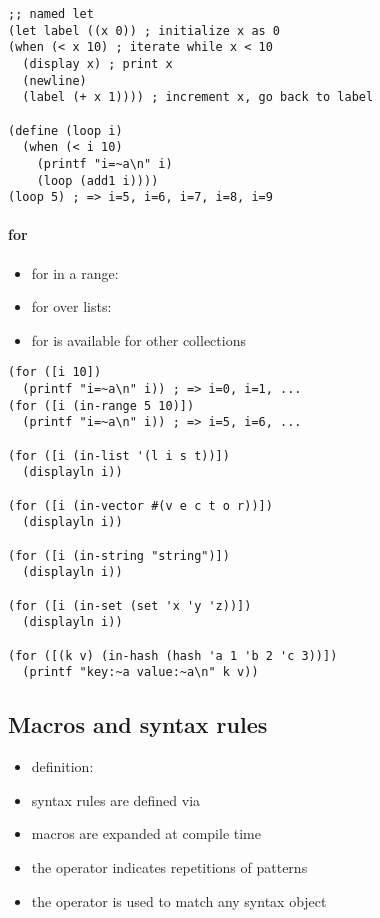\documentclass[a4paper,landscape,10pt]{article}
\begin{document}
\begin{multicols*}{2}
  \begin{lstlisting}[language=Racket]
;; named let
(let label ((x 0)) ; initialize x as 0
(when (< x 10) ; iterate while x < 10
  (display x) ; print x
  (newline)
  (label (+ x 1)))) ; increment x, go back to label

(define (loop i)
  (when (< i 10)
    (printf "i=~a\n" i)
    (loop (add1 i))))
(loop 5) ; => i=5, i=6, i=7, i=8, i=9
  \end{lstlisting}

  \paragraph{for}

  \begin{itemize}
    \item for in a range: 
    \item for over lists: 
    \item for is available for other collections
  \end{itemize}

  \begin{lstlisting}[language=Racket]
(for ([i 10])
  (printf "i=~a\n" i)) ; => i=0, i=1, ...
(for ([i (in-range 5 10)])
  (printf "i=~a\n" i)) ; => i=5, i=6, ...

(for ([i (in-list '(l i s t))])
  (displayln i))

(for ([i (in-vector #(v e c t o r))])
  (displayln i))

(for ([i (in-string "string")])
  (displayln i))

(for ([i (in-set (set 'x 'y 'z))])
  (displayln i))

(for ([(k v) (in-hash (hash 'a 1 'b 2 'c 3))])
  (printf "key:~a value:~a\n" k v))
  \end{lstlisting}

  \subsection{Macros and syntax rules}

  \begin{itemize}
    \item definition: 
    \item syntax rules are defined via 
    \item macros are expanded at compile time
    \item the  operator indicates repetitions of patterns
    \item the \iracket{_} operator is used to match any syntax object
  \end{itemize}


\end{multicols*}
\end{document}
